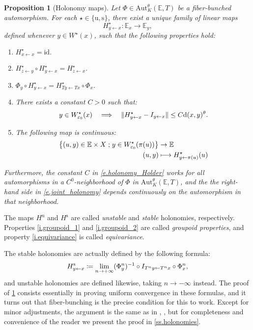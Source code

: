 \documentclass[10pt]{amsart}
\def\vcentcolon{\mathrel{\mathop\ordinarycolon}}
\providecommand\ordinarycolon{:}
\providecommand*\coloneqq{\vcentcolon\mathrel{\mkern-1.2mu}=}
\newcommand\mto{\mathchoice{\longmapsto}{\mapsto}{\mapsto}{\mapsto}}
\newcommand\implique{\mathchoice{\Longrightarrow}{\Rightarrow}{\Rightarrow}{\Rightarrow}}
\theoremstyle{plain}
\newtheorem{proposition}[theorem]{Proposition}
\theoremstyle{definition}
\newcommand{\EE}{\mathbb{E}}
\newcommand{\id}{\mathrm{id}}
\newcommand{\st}{\;\mathord{;}\;}
\newcommand{\dd}{\mathrm{d}}
\newcommand{\uu}{\mathrm{u}}
\renewcommand{\ss}{\mathrm{s}}
\newcommand{\Aut}{\mathrm{Aut}}
\let\epsilon\varepsilon
\begin{document}
\begin{proposition}[Holonomy maps]\label{p.holonomies}
Let	$\Phi \in \Aut^\theta_K(\EE,T)$ be a fiber-bunched automorphism.
For each $\star \in \{\uu,\ss\}$, there exist a unique family of linear maps
\[
H^\star_{y \gets x} \colon \EE_x \to \EE_y,
\]
defined whenever $y \in W^\star(x)$,
such that the following properties hold:
\begin{enumerate}
\item\label{i.groupoid_1}
$H^\star_{x \gets x} = \id$.
\item\label{i.groupoid_2}
$H^\star_{z \gets y} \circ H^\star_{y \gets x} = H^\star_{z \gets x}$.
\item\label{i.equivariance}
$\Phi_y \circ H^\star_{y \gets x} = H^\star_{Ty \gets Tx} \circ \Phi_x$.
\item\label{i.holonomy_Holder}
There exists a constant $C>0$ such that:
\begin{equation}\label{e.holonomy_Holder}
y \in W^\star_{\epsilon_0}(x) \quad \implique \quad
\| H^\star_{y \gets x} - I_{y \gets x} \| \le C \dd(x,y)^\theta.
\end{equation}
\item\label{i.holonomy_cont}
The following map is continuous:
\begin{equation}\label{e.joint_holonomy}
\begin{aligned}
\big\{ (u,y) \in \EE \times X \st y \in W^\star_{\epsilon_0}(\pi(u)) \big\} &\to \EE \\
(u,y) &\mto H^\star_{y \gets \pi(u)} (u)
\end{aligned}
\end{equation}
\end{enumerate}
Furthermore, the constant $C$ in \eqref{e.holonomy_Holder} works for all automorphisms in a $C^0$\nobreakdash-neighbor\-hood of $\Phi$ in $\Aut^\theta_K(\EE,T)$, and the the right-hand side in \eqref{e.joint_holonomy} depends continuously on the automorphism in that neighborhood.
\end{proposition}

The maps $H^\uu$ and $H^\ss$ are called \emph{unstable} and \emph{stable} holonomies, respectively.
Properties \eqref{i.groupoid_1} and \eqref{i.groupoid_2} are called \emph{groupoid properties}, and property \eqref{i.equivariance} is called \emph{equivariance}.

The stable holonomies are actually defined by the following formula:
\begin{equation*}
H^\ss_{y \gets x} \coloneqq \lim_{n \to + \infty} (\Phi_y^n)^{-1} \circ I_{T^n y \gets T^n x} \circ \Phi_x^n,
\end{equation*}
and unstable holonomies are defined likewise, taking $n \to -\infty$ instead.
The proof of \cref{p.holonomies} consists essentially in proving uniform convergence in these formulas, and it turns out that fiber-bunching is the precise condition for this to work.
Except for minor adjustments, the argument is the same as in \cite[\S1.4]{BGV}, \cite[\S4.1]{KalSad}, but for completeness and convenience of the reader we present the proof in \cref{ss.holonomies}.
\end{document}
